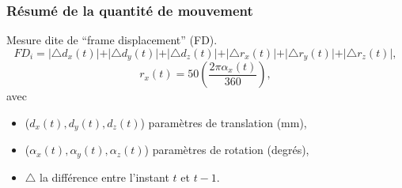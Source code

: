\documentclass{beamer}
\begin{document}

\begin{frame}
\frametitle{Résumé de la quantité de mouvement}
Mesure dite de ``frame displacement'' (FD). 
\begin{equation}
    FD_{i} = \vert \triangle d_{x}(t) \vert + \vert \triangle d_{y}(t) \vert + \vert \triangle d_{z}(t) \vert + \vert \triangle r_x(t) \vert + \vert \triangle r_y(t) \vert + \vert \triangle r_z(t) \vert,
\end{equation}
\begin{equation}
  r_x(t) = 50\left(\frac{2\pi\alpha_x(t)}{360}\right),
\end{equation}
avec 
\begin{itemize}
 \item ($d_x(t),d_{y}(t),d_{z}(t)$) paramètres de translation (mm),
 \item ($\alpha_x(t),\alpha_y(t),\alpha_z(t)$) paramètres de rotation (degrés),
 \item $\triangle$ la différence entre l'instant $t$ et $t-1$.
\end{itemize}
\end{frame}




\end{document}
